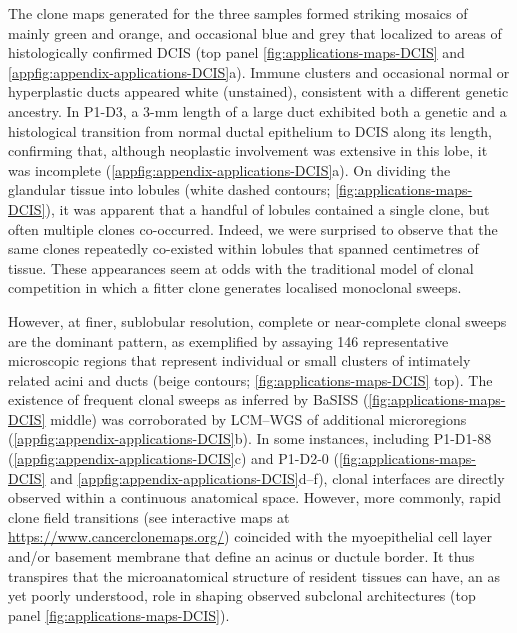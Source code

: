 The clone maps generated for the three samples formed striking mosaics of mainly green and orange, and occasional blue and grey that localized to areas of histologically confirmed \ac{DCIS} (top panel \cref{fig:applications-maps-DCIS} and \cref{appfig:appendix-applications-DCIS}a). Immune clusters and occasional normal or hyperplastic ducts appeared white (unstained), consistent with a different genetic ancestry. In P1-D3, a 3-mm length of a large duct exhibited both a genetic and a histological transition from normal ductal epithelium to \ac{DCIS} along its length, confirming that, although neoplastic involvement was extensive in this lobe, it was incomplete (\cref{appfig:appendix-applications-DCIS}a). On dividing the glandular tissue into lobules (white dashed contours; \cref{fig:applications-maps-DCIS}), it was apparent that a handful of lobules contained a single clone, but often multiple clones co-occurred. Indeed, we were surprised to observe that the same clones repeatedly co-existed within lobules that spanned centimetres of tissue. These appearances seem at odds with the traditional model of clonal competition in which a fitter clone generates localised monoclonal sweeps.


However, at finer, sublobular resolution, complete or near-complete clonal sweeps are the dominant pattern, as exemplified by assaying 146 representative microscopic regions that represent individual or small clusters of intimately related acini and ducts (beige contours; \cref{fig:applications-maps-DCIS} top). The existence of frequent clonal sweeps as inferred by \ac{BaSISS} (\cref{fig:applications-maps-DCIS} middle) was corroborated by \ac{LCM}–\ac{WGS} of additional microregions (\cref{appfig:appendix-applications-DCIS}b). In some instances, including P1-D1-88 (\cref{appfig:appendix-applications-DCIS}c) and P1-D2-0 (\cref{fig:applications-maps-DCIS} and \cref{appfig:appendix-applications-DCIS}d–f), clonal interfaces are directly observed within a continuous anatomical space. However, more commonly, rapid clone field transitions (see interactive maps at \href{https://www.cancerclonemaps.org/}{https://www.cancerclonemaps.org/}) coincided with the myoepithelial cell layer and/or basement membrane that define an acinus or ductule border. It thus transpires that the microanatomical structure of resident tissues can have, an as yet poorly understood, role in shaping observed subclonal architectures (top panel \cref{fig:applications-maps-DCIS}).

